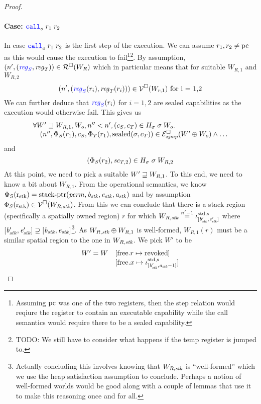 \documentclass[a4paper]{article}
\begin{document}
\begin{proof}
\paragraph{Case: $\scall[o]{}{r_1}{r_2}$}
In case $\scall[o]{}{r_1}{r_2}$ is the first step of the execution. We can assume $r_1,r_2 \neq \pcreg$ as this would cause the execution to fail\footnote{Assuming $\pcreg$ was one of the two registers, then the step relation would reqiure the register to contain an executable capability while the call semantics would require there to be a sealed capability.}\footnote{{\color{red} TODO:} We still have to consider what happens if the temp register is jumped to.}. By assumption, $\npair[n']{\stpair{\reg}{\reg}} \in \lrr(W_R)$ which in particular means that for suitable $W_{R,1}$ and $W_{R,2}$
\[
  \npair[n']{(\src{\reg_S}(r_i),\reg_T(r_i))} \in \lrv(W_{r,1}) \text{ for i = 1,2}
\]
We can further deduce that $\src{\reg_S}(r_i)$ for $i=1,2$ are sealed capabilities as the execution would otherwise fail. This gives us
\[
  \begin{array}{l}
    \forall W' \future W_{R,1}, W_o, n'' < n', (c_S,c_T) \in H_\sigma \; \sigma \; W_o \ldotp \\
    \quad \npair[n'']{\Phi_S(r_1),c_S,\Phi_T(r_1),\sealed{\sigma,c_T}} \in \lrexj(W' \oplus W_o) \wedge \dots
  \end{array}
\]
and
\[
  (\Phi_S(r_2), \vsc_{T,2}) \in H_\sigma \; \sigma \; W_{R,2}
\]
At this point, we need to pick a suitable $W' \future W_{R,1}$. To this end, we need to know a bit about $W_{R,1}$. From the operational semantics, we know $\Phi_S(\rstk) = \stkptr{\perm,\baddr_\stk,\eaddr_\stk,\aaddr_\stk}$ and by assumption $\Phi_S(\rstk) \in \lrv(W_{R,\stk})$. From this we can conclude that there is a stack region (specifically a spatially owned region) $r$ for which $W_{R,\stk} \nequal[n'-1] \stdreg{[\baddr_\stk',\eaddr_\stk']}{\spa}$ where $[\baddr_\stk',\eaddr_\stk'] \supseteq [\baddr_\stk,\eaddr_\stk]$\footnote{Actually concluding this involves knowing that $W_{R,\stk}$ is ``well-formed'' which we use the heap satisfaction assumption to conclude. Perhaps a notion of well-formed worlds would be good along with a couple of lemmas that use it to make this reasoning once and for all.}. As $W_{R,\stk} \oplus W_{R,1}$ is well-formed, $W_{R,1}(r)$ must be a similar spatial region to the one in $W_{R,\stk}$.
We pick $W'$ to be
\[
  \begin{array}{r l}
    W' = W     & \update{\mathrm{free}.r}{\revoked}\\
               & \update{\mathrm{free}.x}{\stdreg{[\baddr_\stk',\aaddr_\stk -1]}{\spa}}\\

\end{array}\]
\end{proof}
\end{document}
